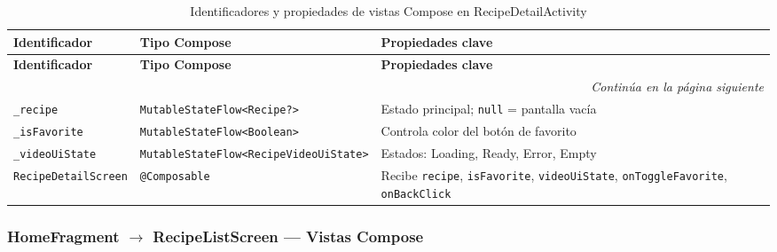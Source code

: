 \documentclass[stu, 12pt, letterpaper, donotrepeattitle, floatsintext, natbib]{apa7}
\begin{document}
\begin{longtable}{@{}p{2.5cm}p{5cm}p{8cm}@{}}
\caption{Identificadores y propiedades de vistas Compose en RecipeDetailActivity}
\label{tab:idrecipedetail}\\
\toprule
\textbf{Identificador} & \textbf{Tipo Compose} & \textbf{Propiedades clave} \\
\midrule
\endfirsthead
\toprule
\textbf{Identificador} & \textbf{Tipo Compose} & \textbf{Propiedades clave} \\
\midrule
\endhead
\midrule
\multicolumn{3}{r}{\small\textit{Continúa en la página siguiente}}\\
\endfoot
\bottomrule
\endlastfoot
\texttt{\_recipe} & \texttt{MutableStateFlow<Recipe?>} & Estado principal; \texttt{null} = pantalla vacía \\[3pt]
\texttt{\_isFavorite} & \texttt{MutableStateFlow<Boolean>} & Controla color del botón de favorito \\[3pt]
\texttt{\_videoUiState} & \texttt{MutableStateFlow<RecipeVideoUiState>} & Estados: Loading, Ready, Error, Empty \\[3pt]
\texttt{RecipeDetailScreen} & \texttt{@Composable} & Recibe \texttt{recipe}, \texttt{isFavorite}, \texttt{videoUiState}, \texttt{onToggleFavorite}, \texttt{onBackClick} \\
\end{longtable}

\subsubsection{HomeFragment $\rightarrow$ RecipeListScreen --- Vistas Compose}
\end{document}
